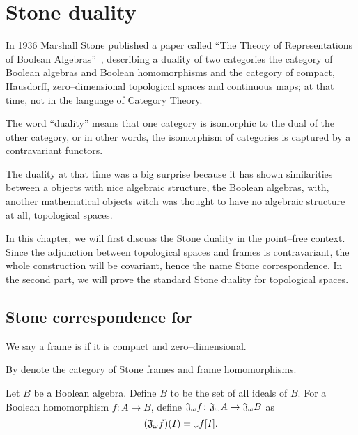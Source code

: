 \chapter{Stone duality}

In 1936 Marshall Stone published a paper called ``The Theory of Representations of Boolean Algebras''~\cite{stone1936theory}, describing a duality of two categories the category of Boolean algebras and Boolean homomorphisms and the category of compact, Hausdorff, zero--dimensional topological spaces and continuous maps; at that time, not in the language of Category Theory.

The word ``duality'' means that one category is isomorphic to the dual of the other category, or in other words, the isomorphism of categories is captured by a contravariant functors.

The duality at that time was a big surprise because it has shown similarities between a objects with nice algebraic structure, the Boolean algebras, with, another mathematical objects witch was thought to have no algebraic structure at all, topological spaces.

In this chapter, we will first discuss the Stone duality in the point--free context. Since the adjunction between topological spaces and frames is contravariant, the whole construction will be covariant, hence the name Stone correspondence. In the second part, we will prove the standard Stone duality for topological spaces.

\section{Stone correspondence for \StoneFrm}

\begin{definition}
    We say a frame is  if it is compact and zero--dimensional.

    By \DEF{\StoneFrm{}} denote the category of Stone frames and frame homomorphisms.
\end{definition}

\begin{definition}
    Let $B$ be a Boolean algebra. Define $B$ to be the set of all ideals of $B$.
    For a Boolean homomorphism $f\colon A \to B$, define $\mathfrak{J}_{\omega} f\colon \mathfrak{J}_{\omega} A \to \mathfrak{J}_{\omega} B$ as
    $$(\mathfrak{J}_{\omega} f)(I) = \mathord{\downarrow}\mkern1mu f[I].$$
\end{definition}

